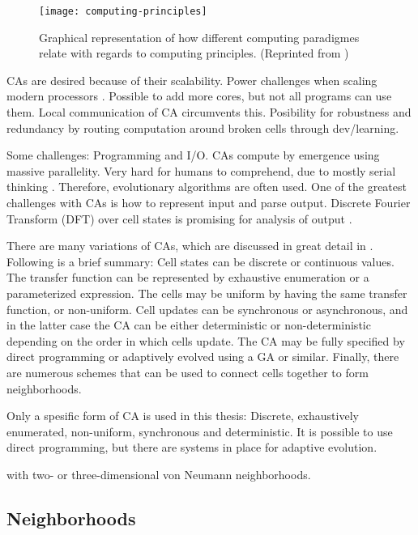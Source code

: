 \begin{figure}[!ht]
    \centering
    \texttt{[image: computing-principles]}
    \caption[Computing principles]{
        Graphical representation of how different computing paradigmes relate with regards to computing principles.
        (Reprinted from \cite{sipper1999emergence})
    }
    \label{fig:computing-principles}
\end{figure}


CAs are desired because of their scalability.
Power challenges when scaling modern processors \CN.
Possible to add more cores, but not all programs can use them.
Local communication of CA circumvents this.
Posibility for robustness and redundancy by routing computation around broken cells through dev/learning.

Some challenges: Programming and I/O.
CAs compute by emergence using massive parallelity.
Very hard for humans to comprehend, due to mostly serial thinking \CN.
Therefore, evolutionary algorithms are often used.
One of the greatest challenges with CAs is how to represent input and parse output.
Discrete Fourier Transform (DFT) over cell states is promising for analysis of output \cite{berg2013ca}.

There are many variations of CAs, which are discussed in great detail in \cite{sipper1999emergence}.
Following is a brief summary:
Cell states can be discrete or continuous values.
The transfer function can be represented by exhaustive enumeration or a parameterized expression.
The cells may be uniform by having the same transfer function, or non-uniform.
Cell updates can be synchronous or asynchronous, and in the latter case the CA can be either deterministic or non-deterministic depending on the order in which cells update.
The CA may be fully specified by direct programming or adaptively evolved using a GA or similar.
Finally, there are numerous schemes that can be used to connect cells together to form neighborhoods.

Only a spesific form of CA is used in this thesis:
Discrete, exhaustively enumerated, non-uniform, synchronous and deterministic.
It is possible to use direct programming, but there are systems in place for adaptive evolution.

\TODO
with two- or three-dimensional von Neumann neighborhoods.

\subsection{Neighborhoods}

